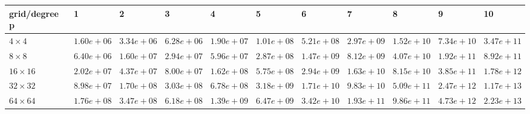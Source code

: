 \begin{tabular}{lllllllllll}
\hline
 grid/degree p   & 1          & 2          & 3          & 4          & 5          & 6          & 7          & 8          & 9          & 10         \\
\hline
 $4 \times 4$    & $1.60e+06$ & $3.34e+06$ & $6.28e+06$ & $1.90e+07$ & $1.01e+08$ & $5.21e+08$ & $2.97e+09$ & $1.52e+10$ & $7.34e+10$ & $3.47e+11$ \\
 $8 \times 8$    & $6.40e+06$ & $1.60e+07$ & $2.94e+07$ & $5.96e+07$ & $2.87e+08$ & $1.47e+09$ & $8.12e+09$ & $4.07e+10$ & $1.92e+11$ & $8.92e+11$ \\
 $16 \times 16$  & $2.02e+07$ & $4.37e+07$ & $8.00e+07$ & $1.62e+08$ & $5.75e+08$ & $2.94e+09$ & $1.63e+10$ & $8.15e+10$ & $3.85e+11$ & $1.78e+12$ \\
 $32 \times 32$  & $8.98e+07$ & $1.70e+08$ & $3.03e+08$ & $6.78e+08$ & $3.18e+09$ & $1.71e+10$ & $9.83e+10$ & $5.09e+11$ & $2.47e+12$ & $1.17e+13$ \\
 $64 \times 64$  & $1.76e+08$ & $3.47e+08$ & $6.18e+08$ & $1.39e+09$ & $6.47e+09$ & $3.42e+10$ & $1.93e+11$ & $9.86e+11$ & $4.73e+12$ & $2.23e+13$ \\
\hline
\end{tabular}